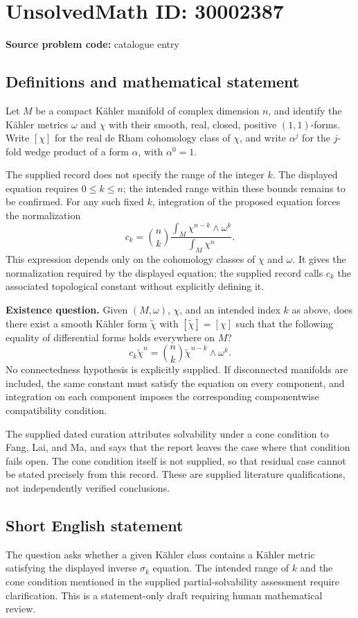 \documentclass[11pt]{article}
\begin{document}
\section*{UnsolvedMath ID: 30002387}
\textbf{Source problem code:} catalogue entry
\subsection{Definitions and mathematical statement}
Let \(M\) be a compact Kähler manifold of complex dimension \(n\), and identify the Kähler metrics \(\omega\) and \(\chi\) with their smooth, real, closed, positive \((1,1)\)-forms. Write \([\chi]\) for the real de Rham cohomology class of \(\chi\), and write \(\alpha^j\) for the \(j\)-fold wedge product of a form \(\alpha\), with \(\alpha^0=1\).

The supplied record does not specify the range of the integer \(k\). The displayed equation requires \(0\leq k\leq n\); the intended range within these bounds remains to be confirmed. For any such fixed \(k\), integration of the proposed equation forces the normalization
\[
 c_k=\binom{n}{k}\frac{\displaystyle\int_M\chi^{n-k}\wedge\omega^k}{\displaystyle\int_M\chi^n}.
\]
This expression depends only on the cohomology classes of \(\chi\) and \(\omega\). It gives the normalization required by the displayed equation; the supplied record calls \(c_k\) the associated topological constant without explicitly defining it.

\textbf{Existence question.} Given \((M,\omega)\), \(\chi\), and an intended index \(k\) as above, does there exist a smooth Kähler form \(\widetilde\chi\) with \([\widetilde\chi]=[\chi]\) such that the following equality of differential forms holds everywhere on \(M\)?
\[
 c_k\widetilde\chi^n
 =\binom{n}{k}\widetilde\chi^{n-k}\wedge\omega^k.
\]
No connectedness hypothesis is explicitly supplied. If disconnected manifolds are included, the same constant must satisfy the equation on every component, and integration on each component imposes the corresponding componentwise compatibility condition.

The supplied dated curation attributes solvability under a cone condition to Fang, Lai, and Ma, and says that the report leaves the case where that condition fails open. The cone condition itself is not supplied, so that residual case cannot be stated precisely from this record. These are supplied literature qualifications, not independently verified conclusions.
\subsection{Short English statement}
The question asks whether a given Kähler class contains a Kähler metric satisfying the displayed inverse \(\sigma_k\) equation. The intended range of \(k\) and the cone condition mentioned in the supplied partial-solvability assessment require clarification. This is a statement-only draft requiring human mathematical review.
\end{document}
